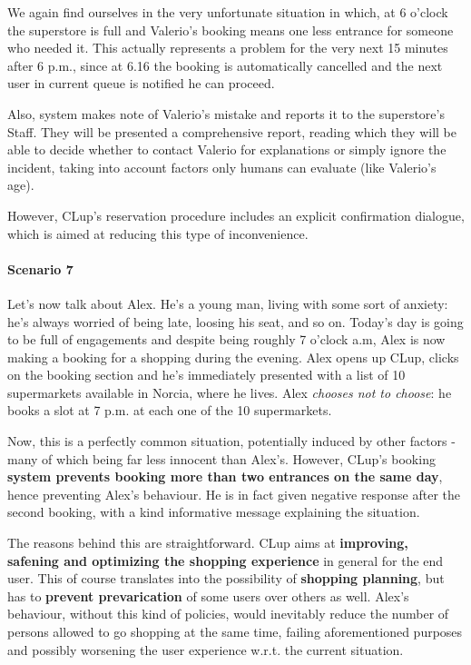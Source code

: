 We again find ourselves in the very unfortunate situation in which, at 6 o'clock the superstore is full and Valerio's booking means one less entrance for someone who needed it. This actually represents a problem for the very next 15 minutes after 6 p.m., since at 6.16 the booking is automatically cancelled and the next user in current queue is notified he can proceed. 

Also, system makes note of Valerio's mistake and reports it to the superstore's Staff. They will be presented a comprehensive report, reading which they will be able to decide whether to contact Valerio for explanations or simply ignore the incident, taking into account factors only humans can evaluate (like Valerio's age).\newline

However, CLup's reservation procedure includes an explicit confirmation dialogue, which is aimed at reducing this type of inconvenience.

\paragraph{Scenario 7}

Let's now talk about Alex. He's a young man, living with some sort of anxiety: he's always worried of being late, loosing his seat, and so on.
Today's day is going to be full of engagements and despite being roughly 7 o'clock a.m, Alex is now making a booking for a shopping during the evening. \newline
Alex opens up CLup, clicks on the booking section and he's immediately presented with a list of 10 supermarkets available in Norcia, where he lives. Alex \textit{chooses not to choose}: he books a slot at 7 p.m. at each one of the 10 supermarkets.

Now, this is a perfectly common situation, potentially induced by other factors - many of which being far less innocent than Alex's. \newline
However, CLup's booking \textbf{system prevents booking more than two entrances on the same day}, hence preventing Alex's behaviour. He is in fact given negative response after the second booking, with a kind informative message explaining the situation.

The reasons behind this are straightforward. CLup aims at \textbf{improving, safening and optimizing the shopping experience} in general for the end user. This of course translates into the possibility of \textbf{shopping planning}, but has to \textbf{prevent prevarication} of some users over others as well. \newline
Alex's behaviour, without this kind of policies, would inevitably reduce the number of persons allowed to go shopping at the same time, failing aforementioned purposes and possibly worsening the user experience w.r.t. the current situation.

